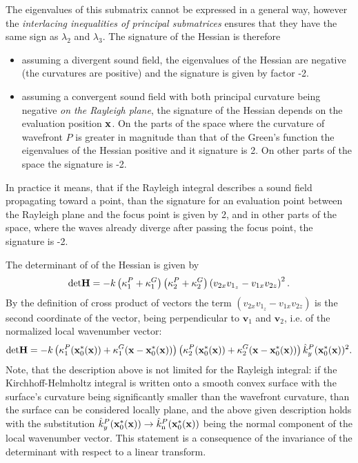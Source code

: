 The eigenvalues of this submatrix cannot be expressed in a general way, however the \emph{interlacing inequalities of principal submatrices}
ensures that they have the same sign as $\lambda_2$ and $\lambda_3$.
The signature of the Hessian is therefore 
\begin{itemize}
\item assuming a divergent sound field, the eigenvalues of the Hessian are negative (the curvatures are positive) and the signature is given by factor -2.
\item assuming a convergent sound field with both principal curvature being negative \emph{on the Rayleigh plane}, the signature of the Hessian depends on the evaluation position $\mathbf{x}$.
On the parts of the space where the curvature of wavefront $P$ is greater in magnitude than that of the Green's function the eigenvalues of the Hessian positive and it signature is 2.
On other parts of the space the signature is -2.
\end{itemize}
In practice it means, that if the Rayleigh integral describes a sound field propagating toward a point, than the signature for an evaluation point between the Rayleigh plane and the focus point is given by 2, and in other parts of the space, where the waves already diverge after passing the focus point, the signature is -2.

The determinant of of the Hessian is given by
\begin{equation}
\mathrm{det} \mathbf{H}  = -k \left( \kappa_1^P+\kappa_1^G \right) \left( \kappa_2^P+\kappa_2^G \right) \left( v_{2 x} v_{1_z} - v_{1 x} v_{2 z} \right)^2.
\end{equation}
By the definition of cross product of vectors the term $\left( v_{2 x} v_{1_z} - v_{1 x} v_{2 z} \right)$ is the second coordinate of the vector, being perpendicular to $\mathbf{v}_1$ and $\mathbf{v}_2$, i.e. of the normalized local wavenumber vector:
\begin{equation}
\mathrm{det} \mathbf{H}  = -k \left( \kappa_1^P(\mathbf{x}_0^*(\mathbf{x}))+\kappa_1^G(\mathbf{x}-\mathbf{x}_0^*(\mathbf{x})) \right) \left( \kappa_2^P(\mathbf{x}_0^*(\mathbf{x}))+\kappa_2^G(\mathbf{x}-\mathbf{x}_0^*(\mathbf{x})) \right) \hat{k}_y^P(\mathbf{x}_0^*(\mathbf{x}))^2.
\end{equation}
Note, that the description above is not limited for the Rayleigh integral: if the Kirchhoff-Helmholtz integral is written onto a smooth convex surface with the surface's curvature being significantly smaller than the wavefront curvature, than the surface can be considered locally plane, and the above given description holds with the substitution $\hat{k}_y^P(\mathbf{x}_0^*(\mathbf{x})) \rightarrow \hat{k}_{\mathrm{n}}^P(\mathbf{x}_0^*(\mathbf{x}))$ being the normal component of the local wavenumber vector.
This statement is a consequence of the invariance of the determinant with respect to a linear transform.
	
